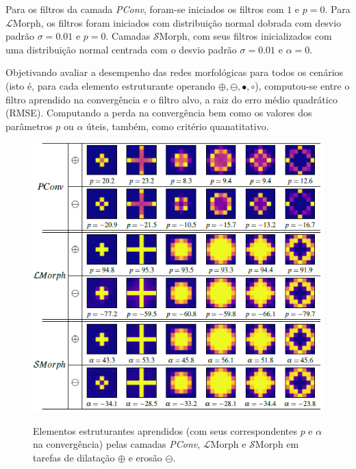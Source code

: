 Para os filtros da camada \emph{PConv}, foram-se iniciados os filtros com $1$ e $p = 0$.
Para $\mathcal{L}$Morph, os filtros foram iniciados com distribuição normal dobrada com desvio padrão $\sigma = 0.01$ e $p = 0$.
Camadas $\mathcal{S}$Morph, com seus filtros inicializados com uma distribuição normal centrada com o desvio padrão $\sigma = 0.01$ e $\alpha = 0$.

Objetivando avaliar a desempenho das redes morfológicas para todos os cenários (isto é, para cada elemento estruturante operando $\oplus, \ominus, \bullet, \circ$), computou-se entre o filtro aprendido na convergência e o filtro alvo, a raiz do erro médio quadrático (RMSE).
Computando a perda na convergência bem como os valores dos parâmetros $p$ ou $\alpha$ úteis, também, como critério quanatitativo.

\begin{figure}
    \caption{Elementos estruturantes aprendidos (com seus correspondentes $p$ e $\alpha$ na convergência) pelas camadas \emph{PConv}, $\mathcal{L}$Morph e $\mathcal{S}$Morph em tarefas de dilatação $\oplus$ e erosão $\ominus$.}
    \centering
    \includegraphics[scale=0.9]{images/ElementosEstrurantesAprendidos1}
    \label{fig:elementos-estruturantes-aprendidos-1}
\end{figure}

